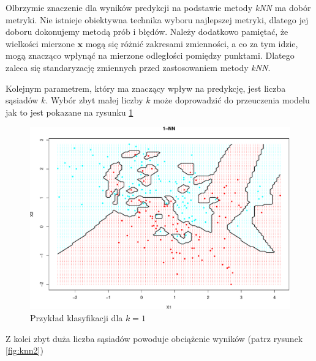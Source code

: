 \documentclass[
]{book}
\theoremstyle{plain}
\theoremstyle{definition}
\theoremstyle{definition}
\theoremstyle{definition}
\theoremstyle{definition}
\theoremstyle{remark}
\begin{document}
Olbrzymie znaczenie dla wyników predykcji na podstawie metody \emph{kNN} ma dobór metryki. Nie istnieje obiektywna technika wyboru najlepszej metryki, dlatego jej doboru dokonujemy metodą prób i błędów. Należy dodatkowo pamiętać, że wielkości mierzone \(\boldsymbol x\) mogą się różnić zakresami zmienności, a co za tym idzie, mogą znacząco wpłynąć na mierzone odległości pomiędzy punktami. Dlatego zaleca się standaryzację zmiennych przed zastosowaniem metody \emph{kNN}.

Kolejnym parametrem, który ma znaczący wpływ na predykcję, jest liczba sąsiadów \(k\). Wybór zbyt małej liczby \(k\) może doprowadzić do przeuczenia modelu jak to jest pokazane na rysunku \ref{fig:knn1}

\begin{figure}

{\centering \includegraphics{EksploracjaDanych_files/figure-latex/knn1-1} 

}

\caption{Przykład klasyfikacji dla $k=1$}\label{fig:knn1}
\end{figure}

Z kolei zbyt duża liczba sąsiadów powoduje obciążenie wyników (patrz rysunek \ref{fig:knn2})
\end{document}
